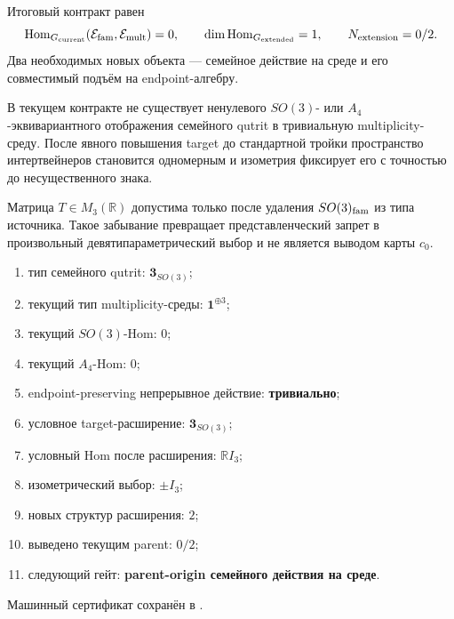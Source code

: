 Итоговый контракт равен
\begin{equation}
 \operatorname{Hom}_{G_{\rm current}}(\mathcal E_{\rm fam},
 \mathcal E_{\rm mult})=0,
 \qquad
 \dim\operatorname{Hom}_{G_{\rm extended}}=1,
 \qquad N_{\rm extension}=0/2.
 \label{eq:v8-baryon-c0-family-multiplicity-admission-ledger}
\end{equation}
Два необходимых новых объекта --- семейное действие на среде и его
совместимый подъём на endpoint-алгебру.

\begin{theorem}
В текущем контракте не существует ненулевого $SO(3)$- или
$A_4$-эквивариантного отображения семейного qutrit в тривиальную
multiplicity-среду. После явного повышения target до стандартной тройки
пространство интертвейнеров становится одномерным и изометрия фиксирует
его с точностью до несущественного знака.
\end{theorem}

\begin{nogocriterion}
Матрица $T\in M_3(\mathbb R)$ допустима только после удаления
$SO(3)_{\rm fam}$ из типа источника. Такое забывание превращает
представленческий запрет в произвольный девятипараметрический выбор и не
является выводом карты $c_0$.
\end{nogocriterion}

\begin{protocol}\begin{enumerate}
\item тип семейного qutrit: \textbf{$\mathbf3_{SO(3)}$};
\item текущий тип multiplicity-среды: \textbf{$\mathbf1^{\oplus3}$};
\item текущий $SO(3)$-Hom: \textbf{$0$};
\item текущий $A_4$-Hom: \textbf{$0$};
\item endpoint-preserving непрерывное действие: \textbf{тривиально};
\item условное target-расширение: \textbf{$\mathbf3_{SO(3)}$};
\item условный Hom после расширения: \textbf{$\mathbb RI_3$};
\item изометрический выбор: \textbf{$\pm I_3$};
\item новых структур расширения: \textbf{$2$};
\item выведено текущим parent: \textbf{$0/2$};
\item следующий гейт: \textbf{parent-origin семейного действия на среде}.
\end{enumerate}\end{protocol}

Машинный сертификат сохранён в
.